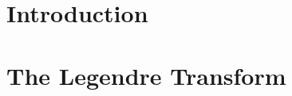 \documentclass[british,11pt,a4paper]{report}
\begin{document}
\maketitle
\tableofcontents
\chapter{Introduction}

\chapter{The Legendre Transform}

\end{document}
